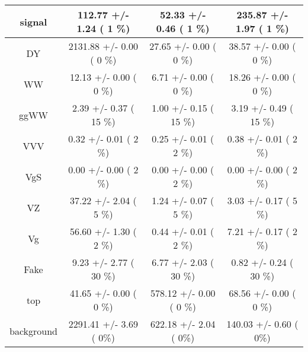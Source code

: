 \begin{table}[h!]\begin{center}
\footnotesize{\begin{tabular}{
c| c | c | c | } \hline
\hline

        signal   &     112.77 +/-       1.24 (         1 \%)   &      52.33 +/-       0.46 (         1 \%)   &     235.87 +/-       1.97 (         1 \%)  \\
\hline
            DY   &    2131.88 +/-       0.00 (         0 \%)   &      27.65 +/-       0.00 (         0 \%)   &      38.57 +/-       0.00 (         0 \%)  \\
            WW   &      12.13 +/-       0.00 (         0 \%)   &       6.71 +/-       0.00 (         0 \%)   &      18.26 +/-       0.00 (         0 \%)  \\
          ggWW   &       2.39 +/-       0.37 (        15 \%)   &       1.00 +/-       0.15 (        15 \%)   &       3.19 +/-       0.49 (        15 \%)  \\
           VVV   &       0.32 +/-       0.01 (         2 \%)   &       0.25 +/-       0.01 (         2 \%)   &       0.38 +/-       0.01 (         2 \%)  \\
           VgS   &       0.00 +/-       0.00 (         2 \%)   &       0.00 +/-       0.00 (         2 \%)   &       0.00 +/-       0.00 (         2 \%)  \\
            VZ   &      37.22 +/-       2.04 (         5 \%)   &       1.24 +/-       0.07 (         5 \%)   &       3.03 +/-       0.17 (         5 \%)  \\
            Vg   &      56.60 +/-       1.30 (         2 \%)   &       0.44 +/-       0.01 (         2 \%)   &       7.21 +/-       0.17 (         2 \%)  \\
          Fake   &       9.23 +/-       2.77 (        30 \%)   &       6.77 +/-       2.03 (        30 \%)   &       0.82 +/-       0.24 (        30 \%)  \\
           top   &      41.65 +/-       0.00 (         0 \%)   &     578.12 +/-       0.00 (         0 \%)   &      68.56 +/-       0.00 (         0 \%)  \\
\hline
    background   &    2291.41 +/-       3.69 (         0\%)   &     622.18 +/-       2.04 (         0\%)   &     140.03 +/-       0.60 (         0\%)  \\
\hline
\end{tabular}
}
\end{center}




\end{table}


